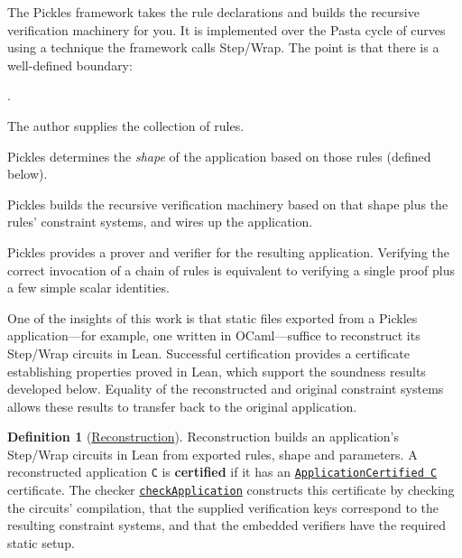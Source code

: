 \documentclass[11pt,a4paper]{article}
\newcommand{\inlinecode}[1]{\mbox{\texttt{#1}}}
\theoremstyle{definition}
\theoremstyle{insetstatement}
\newtheorem{definitiontext}[example]{Definition}
\newenvironment{statementblock}
  {\begin{list}{}{%
    \setlength{\leftmargin}{0pt}%
    \setlength{\rightmargin}{0pt}%
    \setlength{\labelwidth}{0pt}%
    \setlength{\labelsep}{0pt}%
    \setlength{\itemindent}{0pt}%
    \setlength{\listparindent}{0pt}%
    \setlength{\topsep}{.7\baselineskip plus 2pt minus 1pt}%
    \setlength{\partopsep}{0pt}%
    \setlength{\parsep}{0pt}%
    \setlength{\itemsep}{0pt}}%
    \item\relax}
  {\end{list}}
\newenvironment{definition}[1][]
  {\begin{statementblock}\begin{definitiontext}[{#1}]}
  {\end{definitiontext}\end{statementblock}}
\newcounter{boundarypart}
\newenvironment{boundary}{\begin{list}{\arabic{boundarypart}.}{
  \usecounter{boundarypart}
  \setlength{\leftmargin}{1.6em}
  \setlength{\labelwidth}{1.1em}
  \setlength{\labelsep}{0.5em}
  \setlength{\itemsep}{2pt}
  \setlength{\topsep}{3pt}
  \setlength{\parsep}{0pt}}}{\end{list}}
\begin{document}
The Pickles framework takes the rule declarations and builds the recursive
verification machinery for you. It is implemented over the Pasta cycle of
curves using a technique the framework calls Step/Wrap. The point is that
there is a well-defined boundary:
\begin{boundary}
  \item The author supplies the collection of rules.
  \item Pickles determines the \emph{shape} of the application based on those
    rules (defined below).
  \item Pickles builds the recursive verification machinery based on that
    shape plus the rules' constraint systems, and wires up the application.
  \item Pickles provides a prover and verifier for the resulting application.
    Verifying the correct invocation of a chain of rules is equivalent to
    verifying a single proof plus a few simple scalar identities.
\end{boundary}

One of the insights of this work is that static files exported from a
Pickles application---for example, one written in OCaml---suffice to
reconstruct its Step/Wrap circuits in Lean. Successful certification
provides a certificate establishing properties proved in Lean, which
support the soundness results developed below. Equality of the reconstructed
and original constraint systems allows these results to transfer back to
the original application.

\begin{samepage}
\begin{definition}[\href{https://github.com/l-adic/snarky/blob/main/formal/pickles/PicklesFixture/ApplicationImport.lean\#L130}{Reconstruction}]
\label{def:reconstruction}
Reconstruction builds an application's Step/Wrap circuits in Lean from
exported rules, shape and parameters. A reconstructed application \inlinecode{C}
is \textbf{certified} if it has an
\href{https://github.com/l-adic/snarky/blob/main/formal/pickles/Pickles/Application/CheckedCompile.lean\#L201}{\inlinecode{ApplicationCertified C}}
certificate. The checker
\href{https://github.com/l-adic/snarky/blob/main/formal/pickles/Pickles/Application/CheckedCompile.lean\#L302}{\inlinecode{checkApplication}}
constructs this certificate by checking the circuits' compilation, that
the supplied verification keys correspond to the resulting constraint
systems, and that the embedded verifiers have the required static setup.
\end{definition}
\end{samepage}
\end{document}
